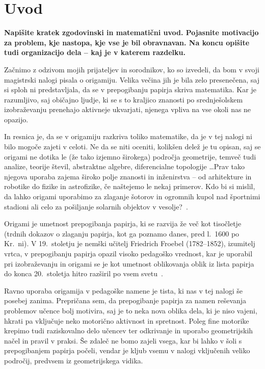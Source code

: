\section{Uvod}

\textbf{Napišite kratek zgodovinski in matematični uvod.  Pojasnite motivacijo za problem, kje nastopa, kje vse je bil obravnavan. Na koncu opišite tudi organizacijo dela -- kaj je v katerem razdelku.}

Začnimo z odzivom mojih prijateljev in sorodnikov, ko so izvedeli, da bom v svoji magistrski nalogi pisala o origamiju. Velika večina jih je bila zelo presenečena, saj si sploh ni predstavljala, da se v prepogibanju papirja skriva matematika. Kar je razumljivo, saj običajno ljudje, ki se s to kraljico znanosti po srednješolskem izobraževanju prenehajo aktivneje ukvarjati, njenega vpliva na vse okoli nas ne opazijo.

In resnica je, da se v origamiju razkriva toliko matematike, da je v tej nalogi ni bilo mogoče zajeti v celoti. Ne da se niti oceniti, kolikšen delež je tu opisan, saj se origami ne dotika le (že tako izjemno širokega) področja geometrije, temveč tudi analize, teorije števil, abstraktne algebre, diferencialne topologije \ldots Prav tako njegova uporaba zajema široko polje znanosti in inženirstva -- od arhitekture in robotike do fizike in astrofizike, če naštejemo le nekaj primerov. Kdo bi si mislil, da lahko origami uporabimo za zlaganje šotorov in ogromnih kupol nad športnimi stadioni ali celo za pošiljanje solarnih objektov v vesolje?~\cite{hull2020}.

Origami je umetnost prepogibanja papirja, ki se razvija že več kot tisočletje (trdnih dokazov o zlaganju papirja, kot ga poznamo danes, pred l.\ 1600 po Kr.\ ni). V 19.\ stoletju je nemški učitelj Friedrich Froebel (1782--1852), izumitelj vrtca, v prepogibanju papirja opazil visoko pedagoško vrednost, kar je uporabil pri izobraževanju in origami se je kot umetnost oblikovanja oblik iz lista papirja do konca 20.\ stoletja hitro razširil po vsem svetu~\cite{robinson2024}.

Ravno uporaba origamija v pedagoške namene je tista, ki nas v tej nalogi še posebej zanima. Prepričana sem, da prepogibanje papirja za namen reševanja problemov učence bolj motivira, saj je to neka nova oblika dela, ki je niso vajeni, hkrati pa vključuje neko motorično aktivnost in spretnost. Poleg fine motorike krepimo tudi raziskovalno delo učencev ter odkrivanje in uporabo geometrijskih načel in pravil v praksi. Še zdaleč ne bomo zajeli vsega, kar bi lahko v šoli s prepogibanjem papirja počeli, vendar je kljub vsemu v nalogi vključenih veliko področij, predvsem iz geometrijskega vidika.

